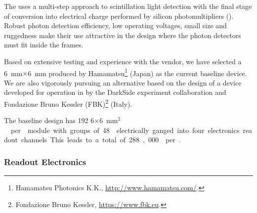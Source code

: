 The   uses a multi-step approach to scintillation light detection with the final stage of conversion into electrical charge performed by silicon photomultipliers (). Robust photon detection efficiency, low operating voltages, small size and ruggedness make their use attractive in the \single design where the photon detectors must fit inside the  frames. 

Based on extensive testing and experience with the vendor, we have selected a \SI{6}{mm}$\times$\SI{6}{mm}  %
produced by Hamamatsu\footnote{Hamamatsu\texttrademark{} Photonics K.K., \url{http://www.hamamatsu.com/}.} (Japan) as the current baseline  device. 
We are also vigorously pursuing an alternative based on the design of a device developed for operation in \lar by the DarkSide experiment collaboration and Fondazione Bruno Kessler (FBK)\footnote{Fondazione Bruno Kessler\texttrademark{}, \url{https://www.fbk.eu}.} (Italy).

The baseline  design has 192 \num{6}$\times$\SI{6}{mm$^2$}  per  module with groups of 48  electrically ganged into four electronics readout channels. This leads to a total of 288,000  per . 





\subsubsection{Readout Electronics} 

